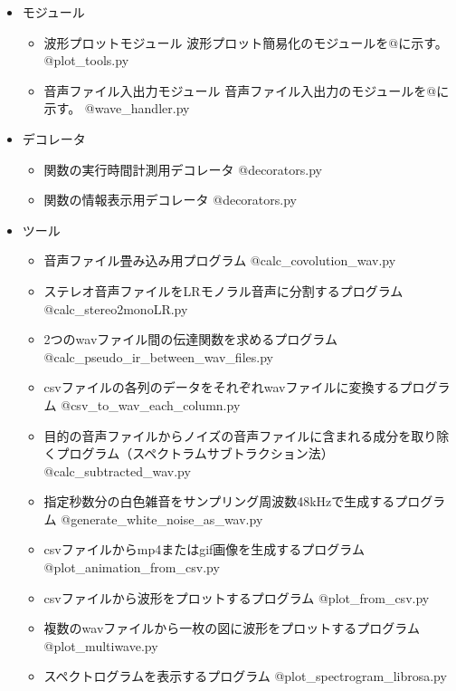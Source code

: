 \begin{itemize}
\tightlist
\item
  モジュール

  \begin{itemize}
  \item
    波形プロットモジュール 波形プロット簡易化のモジュールを@に示す。
    @plot\_tools.py
  \item
    音声ファイル入出力モジュール
    音声ファイル入出力のモジュールを@に示す。 @wave\_handler.py
  \end{itemize}
\item
  デコレータ

  \begin{itemize}
  \item
    関数の実行時間計測用デコレータ @decorators.py
  \item
    関数の情報表示用デコレータ @decorators.py
  \end{itemize}
\item
  ツール

  \begin{itemize}
  \item
    音声ファイル畳み込み用プログラム @calc\_covolution\_wav.py
  \item
    ステレオ音声ファイルをLRモノラル音声に分割するプログラム
    @calc\_stereo2monoLR.py
  \item
    2つのwavファイル間の伝達関数を求めるプログラム
    @calc\_pseudo\_ir\_between\_wav\_files.py
  \item
    csvファイルの各列のデータをそれぞれwavファイルに変換するプログラム
    @csv\_to\_wav\_each\_column.py
  \item
    目的の音声ファイルからノイズの音声ファイルに含まれる成分を取り除くプログラム（スペクトラムサブトラクション法）
    @calc\_subtracted\_wav.py
  \item
    指定秒数分の白色雑音をサンプリング周波数48kHzで生成するプログラム
    @generate\_white\_noise\_as\_wav.py
  \item
    csvファイルからmp4またはgif画像を生成するプログラム
    @plot\_animation\_from\_csv.py
  \item
    csvファイルから波形をプロットするプログラム @plot\_from\_csv.py
  \item
    複数のwavファイルから一枚の図に波形をプロットするプログラム
    @plot\_multiwave.py
  \item
    スペクトログラムを表示するプログラム @plot\_spectrogram\_librosa.py
  \end{itemize}
\end{itemize}

